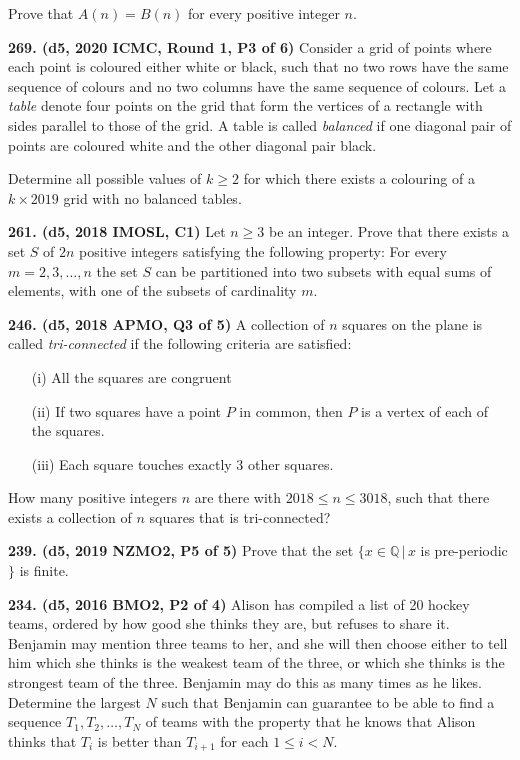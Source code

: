 \documentclass{article}
\begin{document}
        \makebox[1.5em]{}Prove that \(A(n) = B(n)\) for every positive integer \(n\).

        \textbf{269. (\color{red}d5\color{black}, 2020 ICMC, Round 1, P3 of 6)} Consider a grid of points where each point is coloured either white or black, such that no two rows have the same sequence of colours and no two columns have the same sequence of colours. Let a \emph{table} denote four points on the grid that form the vertices of a rectangle with sides parallel to those of the grid. A table is called \emph{balanced} if one diagonal pair of points are coloured white and the other diagonal pair black.

        Determine all possible values of $ k \geq 2 $ for which there exists a colouring of a $ k \times 2019 $ grid with no balanced tables.

        \textbf{261. (\color{red}d5\color{black}, 2018 IMOSL, C1)} Let $n \geq 3$ be an integer. Prove that there exists a set $S$ of $2n$ positive integers satisfying the following property: For every $m = 2, 3, \dots, n$ the set $S$ can be partitioned into two subsets with equal sums of elements, with one of the subsets of cardinality $m$.

        \textbf{246. (\color{red}d5\color{black}, 2018 APMO, Q3 of 5)} A collection of $n$ squares on the plane is called \textit{tri-connected} if the following criteria are satisfied:

        \begin{itemize}

                \item[(i)] All the squares are congruent

                \item[(ii)] If two squares have a point $P$ in common, then $P$ is a vertex of each of the squares.

                \item[(iii)] Each square touches exactly 3 other squares.

        \end{itemize}

        How many positive integers $n$ are there with $2018 \leq n \leq 3018$, such that there exists a collection of $n$ squares that is tri-connected?

        \textbf{239. (\color{red}d5\color{black}, 2019 NZMO2, P5 of 5)} Prove that the set $\{x \in \mathbb{Q} \, | \, x$ is pre-periodic$\}$ is finite.

        \textbf{234. (\color{red}d5\color{black}, 2016 BMO2, P2 of 4)} Alison has compiled a list of 20 hockey teams, ordered by how good she thinks they are, but refuses to share it. Benjamin may mention three teams to her, and she will then choose either to tell him which she thinks is the weakest team of the three, or which she thinks is the strongest team of the three. Benjamin may do this as many times as he likes. Determine the largest \(N\) such that Benjamin can guarantee to be able to find a sequence \(T_1, T_2, \dots, T_N\) of teams with the property that he knows that Alison thinks that \(T_i\) is better than \(T_{i+1}\) for each \(1 \leq i < N\).
\end{document}
